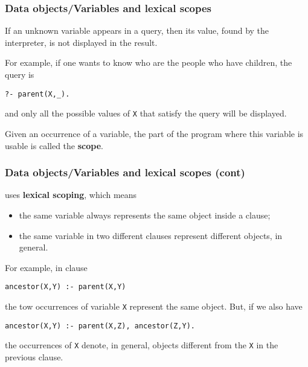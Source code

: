 %
\begin{frame}[containsverbatim]
\frametitle{Data objects/Variables and lexical scopes}

If an unknown variable appears in a query, then its value, found by
the interpreter, is not displayed in the result.

\bigskip

For example, if one wants to know who are the people who have
children, the \Prolog query is
{\small
\begin{verbatim}
?- parent(X,_).
\end{verbatim}
}
and only all the possible values of \texttt{X} that satisfy the query
will be displayed.

\bigskip

Given an occurrence of a variable, the part of the program where
this variable is usable is called the \textbf{scope}. 

\end{frame}

%
\begin{frame}[containsverbatim]
\frametitle{Data objects/Variables and lexical scopes (cont)}

\Prolog uses \textbf{lexical scoping}, which means
\begin{itemize}
  
  \item the same variable always represents the same object inside a clause;

  \item the same variable in two different clauses represent different
    objects, in general.

\end{itemize}
For example, in clause
{\small
\begin{verbatim}
ancestor(X,Y) :- parent(X,Y)
\end{verbatim}
}
the tow occurrences of variable \texttt{X} represent the same object.
But, if we also have
{\small
\begin{verbatim}
ancestor(X,Y) :- parent(X,Z), ancestor(Z,Y).
\end{verbatim}
}
the occurrences of \texttt{X} denote, in general, objects different
from the \texttt{X} in the previous clause.

\end{frame}


